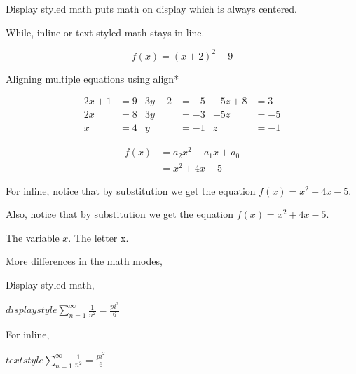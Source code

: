 \documentclass[10pt]{article}
\begin{document}
	
	Display styled math puts math on display which is always centered.
	
	While, inline or text styled math stays in line.
	
	\[f(x) = (x + 2)^2-9\]
	
	Aligning multiple equations using align*
	
	\begin{align*}
		2x + 1 & = 9	& 3y - 2 & = -5		& -5z + 8 & =  3 \\
			2x & = 8	&	  3y & = -3		& 	  -5z & = -5 \\
			 x & = 4	&	   y & = -1		&		z & = -1
	\end{align*}

	\begin{align*}
		f(x) & = a_2 x^2 + a_1 x + a_0 \nonumber \\
			 & = x^2 + 4x - 5
	\end{align*}

	For inline, notice that by substitution we get the equation $f(x) = x^2 + 4x - 5$.
	
	Also, notice that by substitution we get the equation \(f(x) = x^2 + 4x - 5\).
	
	The variable \(x\).
	The letter x.
	
	More differences in the math modes,
	
	Display styled math,
	
	\(displaystyle \sum_{n=1}^{\infty}\frac{1}{n^2} = \frac{pi^2}{6} \)
	
	For inline,
	
	\(textstyle \sum_{n=1}^{\infty}\frac{1}{n^2} = \frac{pi^2}{6} \)
	
    
\end{document}
